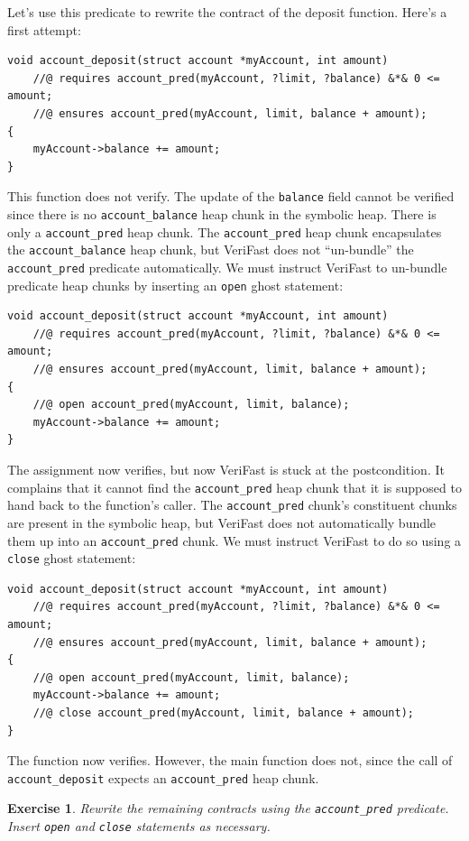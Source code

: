\documentclass{article}
\newtheorem{exercise}{Exercise}
\begin{document}
Let's use this predicate to rewrite the contract of the deposit function. Here's a first attempt:
\begin{lstlisting}
void account_deposit(struct account *myAccount, int amount)
    //@ requires account_pred(myAccount, ?limit, ?balance) &*& 0 <= amount;
    //@ ensures account_pred(myAccount, limit, balance + amount);
{
    myAccount->balance += amount;
}
\end{lstlisting}
This function does not verify. The update of the
\lstinline!balance! field cannot be verified since there is no
\lstinline!account_balance! heap chunk in the symbolic heap.
There is only a \lstinline!account_pred! heap chunk. The
\lstinline!account_pred! heap chunk encapsulates the
\lstinline!account_balance! heap chunk, but VeriFast does not
``un-bundle'' the \lstinline!account_pred! predicate
automatically. We must instruct VeriFast to un-bundle predicate
heap chunks by inserting an \lstinline!open! ghost statement:
\begin{lstlisting}
void account_deposit(struct account *myAccount, int amount)
    //@ requires account_pred(myAccount, ?limit, ?balance) &*& 0 <= amount;
    //@ ensures account_pred(myAccount, limit, balance + amount);
{
    //@ open account_pred(myAccount, limit, balance);
    myAccount->balance += amount;
}
\end{lstlisting}
The assignment now verifies, but now VeriFast is stuck at the
postcondition. It complains that it cannot find the
\lstinline!account_pred! heap chunk that it is supposed to hand
back to the function's caller. The \lstinline!account_pred!
chunk's constituent chunks are present in the symbolic heap,
but VeriFast does not automatically bundle them up into an
\lstinline!account_pred! chunk. We must instruct VeriFast to do
so using a \lstinline!close! ghost statement:
\begin{lstlisting}
void account_deposit(struct account *myAccount, int amount)
    //@ requires account_pred(myAccount, ?limit, ?balance) &*& 0 <= amount;
    //@ ensures account_pred(myAccount, limit, balance + amount);
{
    //@ open account_pred(myAccount, limit, balance);
    myAccount->balance += amount;
    //@ close account_pred(myAccount, limit, balance + amount);
}
\end{lstlisting}
The function now verifies. However, the main function does not,
since the call of \lstinline!account_deposit! expects an
\lstinline!account_pred! heap chunk.

\begin{exercise}\label{exercise:pred}
Rewrite the remaining contracts using the
\lstinline!account_pred! predicate. Insert \lstinline!open! and
\lstinline!close! statements as necessary.
\end{exercise}
\end{document}
